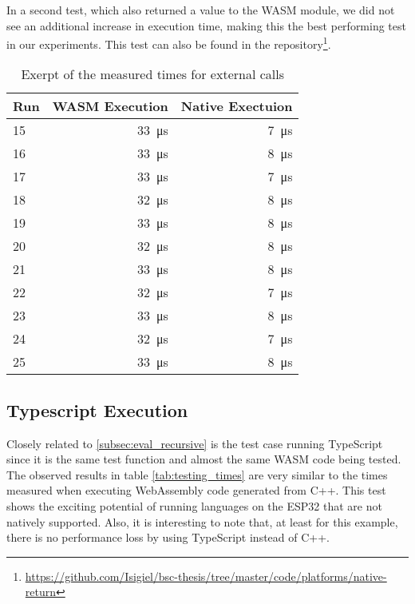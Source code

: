 In a second test, which also returned a value to the WASM module, we did not see an additional increase in execution time, making this the best performing test in our experiments. This test can also be found in the repository\footnote{\url{https://github.com/Isigiel/bsc-thesis/tree/master/code/platforms/native-return}}.

\begin{table} [h]
    \begin{tabular}{l | r r}
        Run & WASM Execution         & Native Exectuion      \\
        \hline
        15  & \SI{33}{\micro\second} & \SI{7}{\micro\second} \\
        16  & \SI{33}{\micro\second} & \SI{8}{\micro\second} \\
        17  & \SI{33}{\micro\second} & \SI{7}{\micro\second} \\
        18  & \SI{32}{\micro\second} & \SI{8}{\micro\second} \\
        19  & \SI{33}{\micro\second} & \SI{8}{\micro\second} \\
        20  & \SI{32}{\micro\second} & \SI{8}{\micro\second} \\
        21  & \SI{33}{\micro\second} & \SI{8}{\micro\second} \\
        22  & \SI{32}{\micro\second} & \SI{7}{\micro\second} \\
        23  & \SI{33}{\micro\second} & \SI{8}{\micro\second} \\
        24  & \SI{32}{\micro\second} & \SI{7}{\micro\second} \\
        25  & \SI{33}{\micro\second} & \SI{8}{\micro\second} \\
    \end{tabular}
    \caption{Exerpt of the measured times for external calls}
    \label{tab:times_native}
\end{table}

\subsection{Typescript Execution}

Closely related to \ref{subsec:eval_recursive} is the test case running TypeScript since it is the same test function and almost the same WASM code being tested. The observed results in table \ref{tab:testing_times} are very similar to the times measured when executing WebAssembly code generated from C++. This test shows the exciting potential of running languages on the ESP32 that are not natively supported. Also, it is interesting to note that, at least for this example, there is no performance loss by using TypeScript instead of C++.

